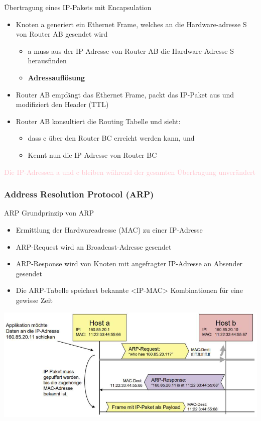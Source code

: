 \begin{example2}{Übertragung eines IP-Pakets mit Encapsulation}
\begin{itemize}
\begin{itemize}
            \item Kennt nun die IP-Adresse von Router AB
        \end{itemize}
        \item Knoten a generiert ein Ethernet Frame, welches an die Hardware-adresse S von Router AB gesendet wird
        \begin{itemize}
            \item a muss aus der IP-Adresse von Router AB die Hardware-Adresse S herausfinden
            \item \textbf{Adressauflösung}
        \end{itemize}
        \item Router AB empfängt das Ethernet Frame, packt das IP-Paket aus und modifiziert den Header (TTL)
        \item Router AB konsultiert die Routing Tabelle und sieht:
        \begin{itemize}
            \item dass c über den Router BC erreicht werden kann, und
            \item Kennt nun die IP-Adresse von Router BC
        \end{itemize}
    \end{itemize}
    \textcolor{pink}{Die IP-Adressen a und c bleiben während der gesamten Übertragung unverändert}\\
\end{example2}

\subsubsection*{Address Resolution Protocol (ARP)}

\begin{concept}{ARP}
    Grundprinzip von ARP
    \begin{itemize}
        \item Ermittlung der Hardwareadresse (MAC) zu einer IP-Adresse
        \item ARP-Request wird an Broadcast-Adresse gesendet
        \item ARP-Response wird von Knoten mit angefragter IP-Adresse an Absender gesendet
        \item Die ARP-Tabelle speichert bekannte <IP-MAC> Kombinationen für eine gewisse Zeit
    \end{itemize}
        \includegraphics[width=1\linewidth]{images/arp_concept.png}
\end{concept}

